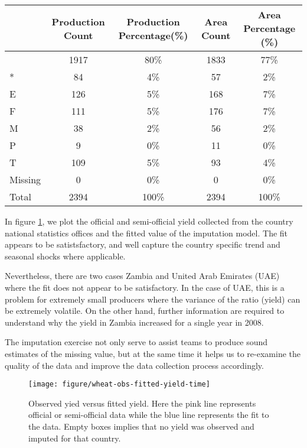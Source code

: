 \documentclass[nojss]{jss}\usepackage[]{graphicx}\usepackage[]{color}
\makeatletter
\def\maxwidth{ %
  \ifdim\Gin@nat@width>\linewidth
    \linewidth
  \else
    \Gin@nat@width
  \fi
}
\newenvironment{knitrout}{}{} %
\makeatother
\begin{document}
\begin{table}[ht]
\centering
\begin{tabular}{|l|c|c|c|c|}
  \hline
 & Production Count & Production Percentage(\%) & Area Count & Area Percentage (\%) \\ 
  \hline
  & 1917 & 80\% & 1833 & 77\% \\ 
  * & 84 & 4\% & 57 & 2\% \\ 
  E & 126 & 5\% & 168 & 7\% \\ 
  F & 111 & 5\% & 176 & 7\% \\ 
  M & 38 & 2\% & 56 & 2\% \\ 
  P & 9 & 0\% & 11 & 0\% \\ 
  T & 109 & 5\% & 93 & 4\% \\ 
  Missing & 0 & 0\% & 0 & 0\% \\ 
  Total & 2394 & 100\% & 2394 & 100\% \\ 
   \hline
\end{tabular}
\end{table}






In figure \ref{fig:wheat-obs-fitted-yield-time}, we plot the official
and semi-official yield collected from the country national statistics
offices and the fitted value of the imputation model. The fit appears
to be satistsfactory, and well capture the country specific trend and
seasonal shocks where applicable. 

Nevertheless, there are two cases Zambia and United Arab Emirates
(UAE) where the fit does not appear to be satisfactory. In the case of
UAE, this is a problem for extremely small producers where the
variance of the ratio (yield) can be extremely volatile. On the other
hand, further information are required to understand why the yield in
Zambia increased for a single year in 2008.

The imputation exercise not only serve to assist teams to produce
sound estimates of the missing value, but at the same time it helps us
to re-examine the quality of the data and improve the data collection
process accordingly.


\begin{knitrout}
\color{fgcolor}\begin{figure}[!ht]


{\centering \texttt{[image: figure/wheat-obs-fitted-yield-time]} 

}

\caption[Observed yied versus fitted yield]{Observed yied versus fitted yield. Here the pink line represents official or semi-official data while the blue line represents the fit to the data. Empty boxes implies that no yield was observed and imputed for that country.\label{fig:wheat-obs-fitted-yield-time}}
\end{figure}


\end{knitrout}
\end{document}
